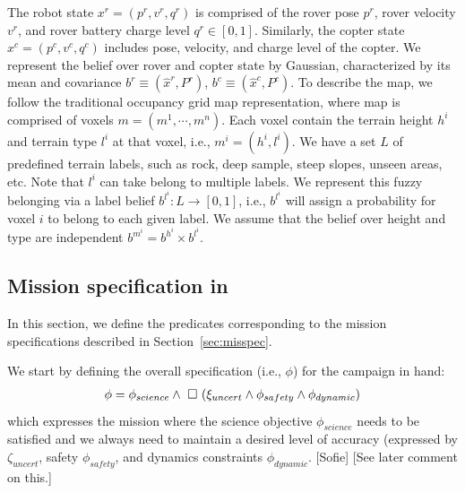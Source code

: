 \documentclass[conference]{IEEEtran}
\newcommand{\sofie}[1]{{\color{purple} [Sofie] #1}}
\begin{document}
    The robot state $x^r=(p^r, v^r, q^r)$ is comprised of the rover pose $p^r$, rover velocity $v^r$, and rover battery charge level $q^r \in [0, 1]$. Similarly, the copter state $x^c=(p^c, v^c, q^c)$ includes pose, velocity, and charge level of the copter. We represent the belief over rover and copter state by Gaussian, characterized by its mean and covariance $b^r\equiv(\hat{x}^r,P^r)$, $b^c\equiv(\hat{x}^c,P^c)$. 
    To describe the map, we follow the traditional occupancy grid map representation, where map is comprised of voxels $m=(m^1,\cdots,m^n)$. Each voxel contain the terrain height $h^i$ and terrain type $l^i$ at that voxel, i.e., $m^i = (h^i,l^i)$. We have a set $L$ of predefined terrain labels, such as rock, deep sample, steep slopes, unseen areas, etc. Note that $l^i$ can take belong to multiple labels. We represent this fuzzy belonging via a label belief $b^{l^i}:L\rightarrow[0,1]$, i.e., $b^{l^i}$ will assign a probability for voxel $i$ to belong to each given label. We assume that the belief over height and type are independent $b^{m^i} = b^{h^i}\times b^{l^i}$. 
    
    
    \subsection{Mission specification in \DTL}
    \label{sec:gdtlspec}
    In this section, we define the \DTL predicates corresponding to the mission specifications described in Section~\ref{sec:misspec}.
    
    We start by defining the overall specification (i.e., $\phi$) for the campaign in hand:
    \begin{align}\label{eq:overallspec}
        \phi = \phi_{science} \land \Always (\pred_{uncert} \land \phi_{safety} \land \phi_{dynamic})
    \end{align}
    which expresses the mission where the science objective $\phi_{science}$ needs to be satisfied and we always need to maintain a desired level of accuracy (expressed by $\zeta_{uncert}$, safety $\phi_{safety}$, and dynamics constraints $\phi_{dynamic}$.
   \sofie{[See later comment on this.]}
\end{document}
